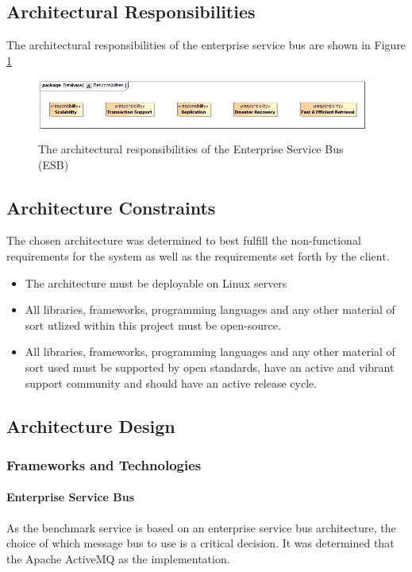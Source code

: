 \subsection{Architectural Responsibilities}
The architectural responsibilities of the enterprise service bus are shown in 
Figure \ref{fig:ESBResponsibilities}
\begin{figure}[H]
	\begin{center}
	\includegraphics[scale=0.5]{../Diagrams and Charts/Database/Responsibilities.jpg}
	\caption{The architectural responsibilities of the Enterprise Service Bus (ESB)}
	\label{fig:ESBResponsibilities}
	\end{center}
\end{figure}

\subsection{Architecture Constraints}
\label{sec:systemArchitecturalConstraints}
The chosen architecture was determined to best fulfill the non-functional
requirements for the system as well as the requirements set forth by the
client.
\begin{itemize}
	\item The architecture must be deployable on Linux servers
	\item All libraries, frameworks, programming languages and any other
	material of sort utlized within this project must be open-source.
	\item All libraries, frameworks, programming languages and any other
	material of sort used must be supported by open standards, have an 
	active and vibrant support community and should have an active 
	release cycle. 	
\end{itemize}

\subsection{Architecture Design}
\subsubsection{Frameworks and Technologies}
\paragraph{Enterprise Service Bus}
As the benchmark service is based on an enterprise service bus architecture,
the choice of which message bus to use is a critical decision. It was determined
that the Apache ActiveMQ as the implementation. 

